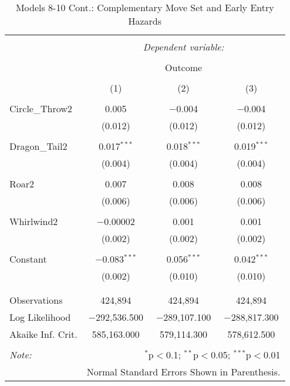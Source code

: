 \documentclass[12pt,twoside]{reedthesis}
\begin{document}
  \begin{table}[!htbp] \centering 
    \caption{Models 8-10 Cont.: Complementary Move Set and Early Entry Hazards} 
    \label{} 
  \begin{tabular}{@{\extracolsep{5pt}}lccc} 
  \\[-1.8ex]\hline 
  \hline \\[-1.8ex] 
   & \multicolumn{3}{c}{\textit{Dependent variable:}} \\ 
  \cline{2-4} 
  \\[-1.8ex] & \multicolumn{3}{c}{Outcome} \\ 
  \\[-1.8ex] & (1) & (2) & (3)\\ 
  \hline \\[-1.8ex] 
   Circle\_Throw2 & 0.005 & $-$0.004 & $-$0.004 \\ 
    & (0.012) & (0.012) & (0.012) \\ 
    & & & \\ 
   Dragon\_Tail2 & 0.017$^{***}$ & 0.018$^{***}$ & 0.019$^{***}$ \\ 
    & (0.004) & (0.004) & (0.004) \\ 
    & & & \\ 
   Roar2 & 0.007 & 0.008 & 0.008 \\ 
    & (0.006) & (0.006) & (0.006) \\ 
    & & & \\ 
   Whirlwind2 & $-$0.00002 & 0.001 & 0.001 \\ 
    & (0.002) & (0.002) & (0.002) \\ 
    & & & \\ 
   Constant & $-$0.083$^{***}$ & 0.056$^{***}$ & 0.042$^{***}$ \\ 
    & (0.002) & (0.010) & (0.010) \\ 
    & & & \\ 
  \hline \\[-1.8ex] 
  Observations & 424,894 & 424,894 & 424,894 \\ 
  Log Likelihood & $-$292,536.500 & $-$289,107.100 & $-$288,817.300 \\ 
  Akaike Inf. Crit. & 585,163.000 & 579,114.300 & 578,612.500 \\ 
  \hline 
  \hline \\[-1.8ex] 
  \textit{Note:}  & \multicolumn{3}{r}{$^{*}$p$<$0.1; $^{**}$p$<$0.05; $^{***}$p$<$0.01} \\ 
   & \multicolumn{3}{r}{Normal Standard Errors Shown in Parenthesis.} \\ 
  \end{tabular} 
  \end{table}
  
\end{document}
